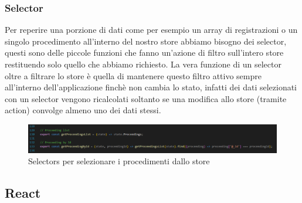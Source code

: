 \subsubsection{Selector}
Per reperire una porzione di dati come per esempio un array di registrazioni o un singolo procedimento all'interno del nostro store abbiamo bisogno dei selector, questi sono delle
piccole funzioni che fanno un'azione di filtro sull'intero store restituendo solo quello che abbiamo richiesto. La vera funzione di un selector oltre a filtrare lo store è quella di
mantenere questo filtro attivo sempre all'interno dell'applicazione finchè non cambia lo stato, infatti dei dati selezionati con un selector vengono ricalcolati soltanto se una
modifica allo store (tramite action) convolge almeno uno dei dati stessi.

\begin{figure}[H]
  \centering
  \includegraphics[width=\textwidth]{immagini/selectors.png}
  \caption{Selectors per selezionare i procedimenti dallo store}
\end{figure}

\subsection{React}

